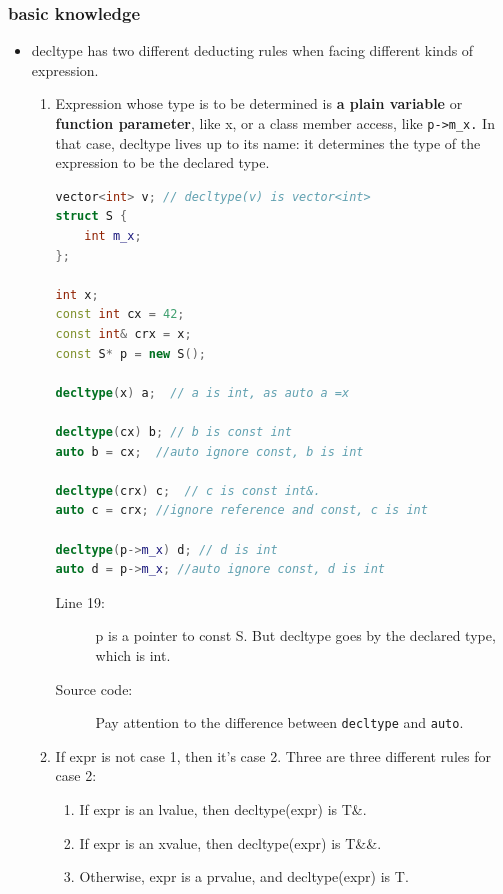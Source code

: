 \documentclass[a4paper,11pt,twoside]{book}
\begin{document}
\subsubsection{basic knowledge}
\begin{itemize}
	\item decltype has two different deducting rules when facing different kinds of expression.
	
	\begin{enumerate}
		\item Expression whose type is to be determined is \textbf{a plain variable} or \textbf{function parameter}, like x, or a class member access, like \texttt{p->m\_x.} In that case, decltype lives up to its name: it determines the type of the expression to be the declared type.
\begin{lstlisting}[frame=single, language=c++]
vector<int> v; // decltype(v) is vector<int>
struct S {
	int m_x;
};

int x;
const int cx = 42;
const int& crx = x;
const S* p = new S();

decltype(x) a;  // a is int, as auto a =x

decltype(cx) b; // b is const int
auto b = cx;  //auto ignore const, b is int

decltype(crx) c;  // c is const int&.
auto c = crx; //ignore reference and const, c is int

decltype(p->m_x) d; // d is int
auto d = p->m_x; //auto ignore const, d is int
\end{lstlisting}
\begin{description}
	\item[Line 19:] p is a pointer to const S. But decltype goes by the declared type, which is int.
	\item[Source code:] Pay attention to the difference between \texttt{decltype} and \texttt{auto}.
\end{description}
		
		\item If expr is not case 1, then it's case 2. Three are three different rules for case 2:
		\begin{enumerate}
			\item If expr is an lvalue, then decltype(expr) is T\&. 
			\item If expr is an xvalue, then decltype(expr) is T\&\&. 
			\item Otherwise, expr is a prvalue, and decltype(expr) is T.
		\end{enumerate}
	\end{enumerate}


\end{itemize}
\end{document}
